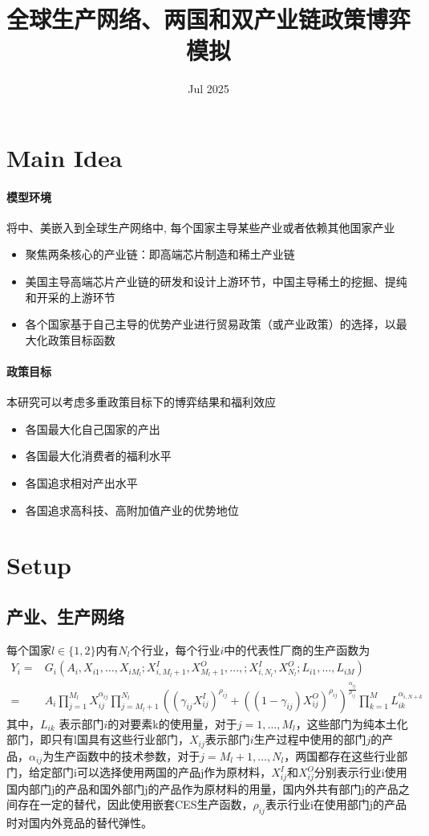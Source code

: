 \documentclass{article}
\title{全球生产网络、两国和双产业链政策博弈模拟}
\author{}
\date{Jul 2025}
\begin{document}
\maketitle
\section{Main Idea}
\paragraph{模型环境}  将中、美嵌入到全球生产网络中, 每个国家主导某些产业或者依赖其他国家产业
\begin{itemize}
    \item 聚焦两条核心的产业链：即高端芯片制造和稀土产业链
    \item 美国主导高端芯片产业链的研发和设计上游环节，中国主导稀土的挖掘、提纯和开采的上游环节
    \item 各个国家基于自己主导的优势产业进行贸易政策（或产业政策）的选择，以最大化政策目标函数
\end{itemize}
\paragraph{政策目标}
本研究可以考虑多重政策目标下的博弈结果和福利效应
\begin{itemize}
    \item 各国最大化自己国家的产出
    \item 各国最大化消费者的福利水平
    \item 各国追求相对产出水平
    \item 各国追求高科技、高附加值产业的优势地位
\end{itemize}
\section{Setup}
\subsection{产业、生产网络}
每个国家$l\in\{1,2\}$内有$N_l$个行业，每个行业$i$中的代表性厂商的生产函数为
\begin{equation}
\begin{aligned}
Y_i=&G_i(A_i,X_{i1},\dots,X_{iM_l};X^I_{i,M_l+1},X^O_{M_l+1},\dots,;X^I_{i,N_l},X^O_{N_l};L_{i1},\dots,L_{iM})\\=&A_i\prod_{j=1}^{M_l} X_{ij}^{\alpha_{ij}}\prod_{j=M_l+1}^{N_l}\left(\left(\gamma_{ij}X_{ij}^I\right)^{\rho_{ij}}+\left((1-\gamma_{ij})X_{ij}^O\right)^{\rho_{ij}}\right)^\frac{\alpha_{ij}}{\rho_{ij}}\prod_{k=1}^{M} L_{ik}^{\alpha_{i,N+k}}
\end{aligned}
\end{equation} 其中，$L_{ik}$ 表示部门$i$的对要素k的使用量，对于$j=1,\dots,M_l$，这些部门为纯本土化部门，即只有l国具有这些行业部门，$X_{ij}$表示部门$i$生产过程中使用的部门$j$的产品，$\alpha_{ij}$为生产函数中的技术参数，对于$j=M_l+1,\dots,N_l$，两国都存在这些行业部门，给定部门i可以选择使用两国的产品j作为原材料，$X_{ij}^I$和$X_{ij}^O$分别表示行业i使用国内部门j的产品和国外部门j的产品作为原材料的用量，国内外共有部门j的产品之间存在一定的替代，因此使用嵌套CES生产函数，$\rho_{ij}$表示行业i在使用部门j的产品时对国内外竞品的替代弹性。
\end{document}
